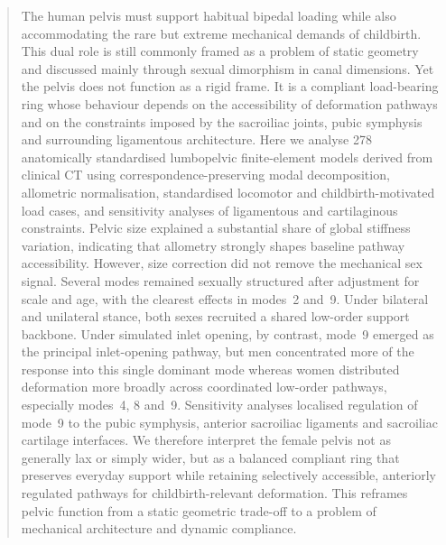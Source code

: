 \documentclass[openacc]{rsproca_new}
\begin{document}
\begin{abstract}
The human pelvis must support habitual bipedal loading while also accommodating the rare but extreme mechanical demands of childbirth. This dual role is still commonly framed as a problem of static geometry and discussed mainly through sexual dimorphism in canal dimensions. Yet the pelvis does not function as a rigid frame. It is a compliant load-bearing ring whose behaviour depends on the accessibility of deformation pathways and on the constraints imposed by the sacroiliac joints, pubic symphysis and surrounding ligamentous architecture. Here we analyse 278 anatomically standardised lumbopelvic finite-element models derived from clinical CT using correspondence-preserving modal decomposition, allometric normalisation, standardised locomotor and childbirth-motivated load cases, and sensitivity analyses of ligamentous and cartilaginous constraints. Pelvic size explained a substantial share of global stiffness variation, indicating that allometry strongly shapes baseline pathway accessibility. However, size correction did not remove the mechanical sex signal. Several modes remained sexually structured after adjustment for scale and age, with the clearest effects in modes~2 and~9. Under bilateral and unilateral stance, both sexes recruited a shared low-order support backbone. Under simulated inlet opening, by contrast, mode~9 emerged as the principal inlet-opening pathway, but men concentrated more of the response into this single dominant mode whereas women distributed deformation more broadly across coordinated low-order pathways, especially modes~4, 8 and~9. Sensitivity analyses localised regulation of mode~9 to the pubic symphysis, anterior sacroiliac ligaments and sacroiliac cartilage interfaces. We therefore interpret the female pelvis not as generally lax or simply wider, but as a balanced compliant ring that preserves everyday support while retaining selectively accessible, anteriorly regulated pathways for childbirth-relevant deformation. This reframes pelvic function from a static geometric trade-off to a problem of mechanical architecture and dynamic compliance.
\end{abstract}

\maketitle
\end{document}
